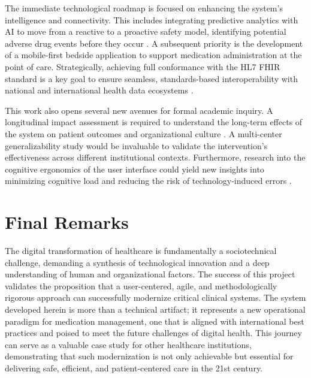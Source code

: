 The immediate technological roadmap is focused on enhancing the system's intelligence and connectivity. This includes integrating predictive analytics with AI to move from a reactive to a proactive safety model, identifying potential adverse drug events before they occur \cite{bates2021,zhao2021}. A subsequent priority is the development of a mobile-first bedside application to support medication administration at the point of care. Strategically, achieving full conformance with the HL7 FHIR standard is a key goal to ensure seamless, standards-based interoperability with national and international health data ecosystems \cite{mandl2020}.

This work also opens several new avenues for formal academic inquiry. A longitudinal impact assessment is required to understand the long-term effects of the system on patient outcomes and organizational culture \cite{greenhalgh2017}. A multi-center generalizability study would be invaluable to validate the intervention's effectiveness across different institutional contexts. Furthermore, research into the cognitive ergonomics of the user interface could yield new insights into minimizing cognitive load and reducing the risk of technology-induced errors \cite{holden2011}.

\section{Final Remarks}

The digital transformation of healthcare is fundamentally a sociotechnical challenge, demanding a synthesis of technological innovation and a deep understanding of human and organizational factors. The success of this project validates the proposition that a user-centered, agile, and methodologically rigorous approach can successfully modernize critical clinical systems. The system developed herein is more than a technical artifact; it represents a new operational paradigm for medication management, one that is aligned with international best practices and poised to meet the future challenges of digital health. This journey can serve as a valuable case study for other healthcare institutions, demonstrating that such modernization is not only achievable but essential for delivering safe, efficient, and patient-centered care in the 21st century. 